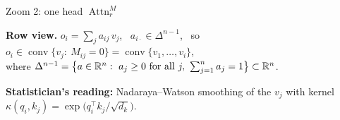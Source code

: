 \documentclass[aspectratio=169,11pt]{beamer}
\newcommand{\Attn}{\operatorname{Attn}}
\begin{document}
\begin{frame}[t]{Zoom 2: one head $\Attn^M_r$}
\begin{center}
\end{center}
\vspace{-0.4em}
{\small\textbf{Row view.} $o_i=\sum_{j}a_{ij}\,v_j$, \ $a_{i\cdot}\in\Delta^{n-1}$, \ so \ $o_i\in\operatorname{conv}\{v_j:\ M_{ij}=0\}=\operatorname{conv}\{v_1,\dots,v_i\}$,\\[2pt]
where $\Delta^{n-1}=\big\{a\in\R^n:\ a_j\ge0\ \text{for all } j,\ \sum_{j=1}^n a_j=1\big\}\subset\R^n$.\par}
{\footnotesize\color{tea}\textbf{Statistician's reading:} Nadaraya--Watson smoothing of the $v_j$ with kernel $\kappa(q_i,k_j)=\exp\big(q_i^\top k_j/\sqrt{d_k}\big)$.\par}
\end{frame}
\end{document}
